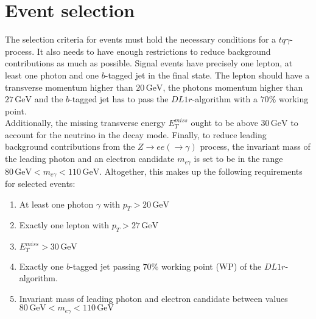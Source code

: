 \section{Event selection}

The selection criteria for events must hold the necessary conditions for a $tq\gamma$-process. It also needs to have enough restrictions to reduce background contributions as much as possible. 
Signal events have precisely one lepton, at least one photon and one $b$-tagged jet in the final state. The lepton should have a transverse momentum higher than $20 \,\si{\giga\electronvolt}$, the photons momentum higher than $27\,\si{\giga\electronvolt}$ and 
the $b$-tagged jet has to pass the $DL1r$-algorithm with a $70\%$ working point.\\
Additionally, the missing transverse energy $E_T^{miss}$ ought to be above $30 \,\si{\giga\electronvolt}$ to account for the neutrino in the decay mode. 
Finally, to reduce leading background contributions from the $Z \rightarrow ee(\rightarrow \gamma)$ process, the invariant mass of the leading photon and an electron candidate $m_{e\gamma}$ is set to be in the range $80 \,\si{\giga\electronvolt} < m_{e\gamma} < 110 \,\si{\giga\electronvolt}$.
Altogether, this makes up the following requirements for selected events:
\begin{enumerate}
    \item At least one photon $\gamma$ with $p_T > 20 \,\si{\giga\electronvolt}$
    \item Exactly one lepton with $p_T >27\,\si{\giga\electronvolt}$
    \item $E_T^{miss} > 30 \,\si{\giga\electronvolt}$
    \item Exactly one $b$-tagged jet passing $70\%$ working point (WP) of the $DL1r$-algorithm. 
    \item Invariant mass of leading photon and electron candidate between values $80 \,\si{\giga\electronvolt} < m_{e\gamma} < 110 \,\si{\giga\electronvolt}$  
\end{enumerate}
